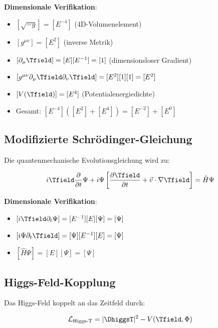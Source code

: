 	\textbf{Dimensionale Verifikation}:
	\begin{itemize}
		\item $[\sqrt{-g}] = [E^{-4}]$ (4D-Volumenelement)
		\item $[g^{\mu\nu}] = [E^2]$ (inverse Metrik)
		\item $[\partial_\mu \Tfield] = [E][E^{-1}] = [1]$ (dimensionsloser Gradient)
		\item $[g^{\mu\nu} \partial_\mu \Tfield \partial_\nu \Tfield] = [E^2][1][1] = [E^2]$
		\item $[V(\Tfield)] = [E^4]$ (Potentialenergiedichte)
		\item Gesamt: $[E^{-4}]([E^2] + [E^4]) = [E^{-2}] + [E^0]$ \checkmark
	\end{itemize}
	
	\subsection{Modifizierte Schrödinger-Gleichung}
	\label{subsec:modifizierte_schroedinger}
	
	Die quantenmechanische Evolutionsgleichung wird zu:
	
	\begin{equation}
		i \Tfield \frac{\partial}{\partial t} \Psi + i \Psi \left[\frac{\partial \Tfield}{\partial t} + \vec{v} \cdot \nabla \Tfield\right] = \hat{H} \Psi
		\label{eq:modifizierte_schroedinger}
	\end{equation}
	
	\textbf{Dimensionale Verifikation}:
	\begin{itemize}
		\item $[i \Tfield \partial_t \Psi] = [E^{-1}][E][\Psi] = [\Psi]$
		\item $[i \Psi \partial_t \Tfield] = [\Psi][E^{-1}][E] = [\Psi]$
		\item $[\hat{H} \Psi] = [E][\Psi] = [\Psi]$ \checkmark
	\end{itemize}
	
	\subsection{Higgs-Feld-Kopplung}
	\label{subsec:higgs_kopplung}
	
	Das Higgs-Feld koppelt an das Zeitfeld durch:
	
	\begin{equation}
		\mathcal{L}_{\text{Higgs-T}} = |\DhiggsT|^2 - V(\Tfield, \Phi)
		\label{eq:higgs_zeit_kopplung}
	\end{equation}
	
